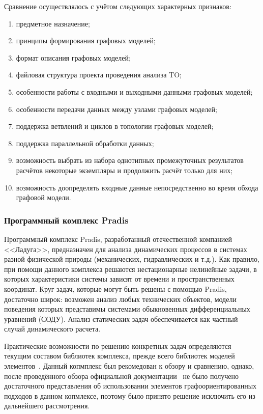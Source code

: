 Сравнение осуществлялось с учётом следующих характерных признаков:
\begin{enumerate}[label=\arabic*)]
    \item предметное назначение;
    \item принципы формирования графовых моделей;
    \item формат описания графовых моделей;
    \item файловая структура проекта проведения анализа \gls{TO};
    \item особенности работы с входными и выходными данными графовых моделей;
    \item особенности передачи данных между узлами графовых моделей;
    \item поддержка ветвлений и циклов в топологии графовых моделей;
    \item поддержка параллельной обработки данных;
    \item возможность выбрать из набора однотипных промежуточных результатов расчётов некоторые экземпляры и продолжить расчёт только для них;
    \item возможность доопределять входные данные непосредственно во время обхода графовой модели.
\end{enumerate}

\subsubsection{Программный комплекс Pradis}

Программный комплекс \textsf{Pradis}, разработанный отечественной компанией <<Ладуга>>, предназначен для анализа динамических процессов в системах разной физической природы (механических, гидравлических и т.д.). Как правило, при помощи данного комплекса решаются нестационарные нелинейные задачи, в которых характеристики системы зависят от времени и пространственных координат. Круг задач, которые могут быть решены с помощью \textsf{Pradis}, достаточно широк: возможен анализ любых технических объектов, модели поведения которых представимы системами обыкновенных дифференциальных уравнений (СОДУ). Анализ статических задач обеспечивается как частный случай динамического расчета.

Практические возможности по решению конкретных задач определяются текущим составом библиотек комплекса, прежде всего библиотек моделей элементов~\cite{PradisGeneral2007}. Данный копмплекс был рекомедован к обзору и сравнению, однако, после проведённого обзора официальной документации~\cite{PradisMethods2007} не было получено достаточного представления об использовании элементов графоориентированных подходов в данном копмлексе, поэтому было принято решение исключить его из дальнейшего рассмотрения.

